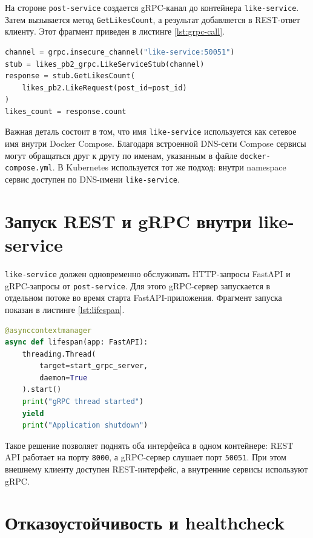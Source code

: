 На стороне \texttt{post-service} создается gRPC-канал до контейнера \texttt{like-service}.
Затем вызывается метод \texttt{GetLikesCount}, а результат добавляется в REST-ответ клиенту.
Этот фрагмент приведен в листинге \ref{lst:grpc-call}.

\begin{lstlisting}[language=Python, caption={Вызов gRPC в post-service}, label={lst:grpc-call}]
channel = grpc.insecure_channel("like-service:50051")
stub = likes_pb2_grpc.LikeServiceStub(channel)
response = stub.GetLikesCount(
    likes_pb2.LikeRequest(post_id=post_id)
)
likes_count = response.count
\end{lstlisting}

Важная деталь состоит в том, что имя \texttt{like-service} используется как сетевое имя внутри
Docker Compose. Благодаря встроенной DNS-сети Compose сервисы могут обращаться друг к другу по
именам, указанным в файле \texttt{docker-compose.yml}. В Kubernetes используется тот же подход:
внутри namespace сервис доступен по DNS-имени \texttt{like-service}.

\section{Запуск REST и gRPC внутри like-service}

\texttt{like-service} должен одновременно обслуживать HTTP-запросы FastAPI и gRPC-запросы от
\texttt{post-service}. Для этого gRPC-сервер запускается в отдельном потоке во время старта
FastAPI-приложения. Фрагмент запуска показан в листинге \ref{lst:lifespan}.

\begin{lstlisting}[language=Python, caption={Запуск gRPC-сервера в lifespan FastAPI}, label={lst:lifespan}]
@asynccontextmanager
async def lifespan(app: FastAPI):
    threading.Thread(
        target=start_grpc_server,
        daemon=True
    ).start()
    print("gRPC thread started")
    yield
    print("Application shutdown")
\end{lstlisting}

Такое решение позволяет поднять оба интерфейса в одном контейнере: REST API работает на порту
\texttt{8000}, а gRPC-сервер слушает порт \texttt{50051}. При этом внешнему клиенту доступен
REST-интерфейс, а внутренние сервисы используют gRPC.

\section{Отказоустойчивость и healthcheck}

